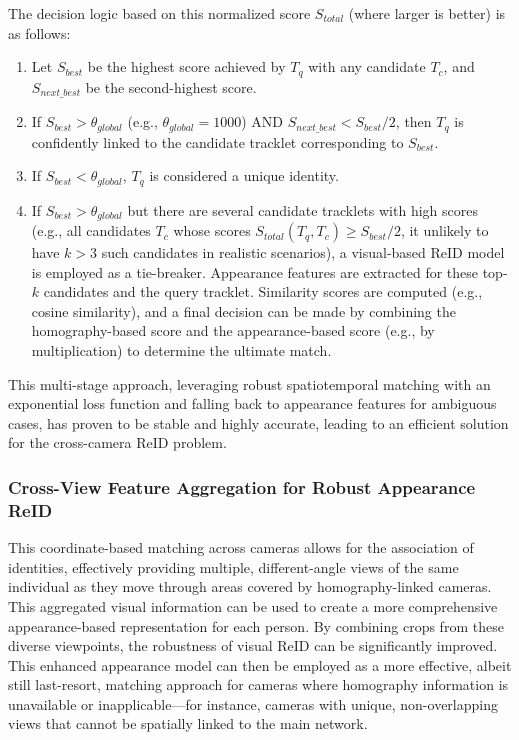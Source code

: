 \documentclass[12pt, a4paper]{article}
\begin{document}
The decision logic based on this normalized score $S_{total}$ (where larger is better) is as follows:
\begin{enumerate}
    \item Let $S_{best}$ be the highest score achieved by $T_q$ with any candidate $T_c$, and $S_{next\_best}$ be the second-highest score.
    \item If $S_{best} > \theta_{global}$ (e.g., $\theta_{global} = 1000$) AND $S_{next\_best} < S_{best} / 2$, then $T_q$ is confidently linked to the candidate tracklet corresponding to $S_{best}$.
    \item If $S_{best} < \theta_{global}$, $T_q$ is considered a unique identity.
    \item If $S_{best} > \theta_{global}$ but there are several candidate tracklets with high scores (e.g., all candidates $T_c$ whose scores $S_{total}(T_q, T_c) \ge S_{best} / 2$, it unlikely to have $k > 3$ such candidates in realistic scenarios), a visual-based ReID model is employed as a tie-breaker. Appearance features are extracted for these top-$k$ candidates and the query tracklet. Similarity scores are computed (e.g., cosine similarity), and a final decision can be made by combining the homography-based score and the appearance-based score (e.g., by multiplication) to determine the ultimate match.
\end{enumerate}
This multi-stage approach, leveraging robust spatiotemporal matching with an exponential loss function and falling back to appearance features for ambiguous cases, has proven to be stable and highly accurate, leading to an efficient solution for the cross-camera ReID problem.

\subsubsection{Cross-View Feature Aggregation for Robust Appearance ReID}

This coordinate-based matching across cameras allows for the association of identities, effectively providing multiple, different-angle views of the same individual as they move through areas covered by homography-linked cameras. This aggregated visual information can be used to create a more comprehensive appearance-based representation for each person. By combining crops from these diverse viewpoints, the robustness of visual ReID can be significantly improved. This enhanced appearance model can then be employed as a more effective, albeit still last-resort, matching approach for cameras where homography information is unavailable or inapplicable—for instance, cameras with unique, non-overlapping views that cannot be spatially linked to the main network.
\end{document}

